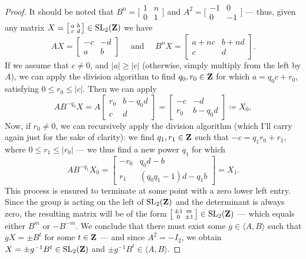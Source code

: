 \begin{proof}
It should be noted that \(B^n = \big[ \begin{smallmatrix} 1 & n \\ 0 &
1 \end{smallmatrix} \big]\) and \(A^2 = \big[ \begin{smallmatrix} -1 & 0 \\ 0 &
-1 \end{smallmatrix} \big]\) --- thus, given any matrix \(X =
\big[ \begin{smallmatrix} a & b \\ c & d \end{smallmatrix} \big] \in \operatorname{SL}_2(\mathbf{Z})\)
we have
\[
  A X =
  \begin{bmatrix}
    -c & -d \\ a & b
  \end{bmatrix}
  \quad
  \text{ and }
  \quad
  B^n X =
  \begin{bmatrix}
    a + n c & b + n d \\ c & d
  \end{bmatrix}.
\]
If we assume that \(c \neq 0\), and \(|a| \geq |c|\) (otherwise, simply multiply
from the left by \(A\)), we can apply the division algorithm to find \(q_0, r_0
\in \mathbf{Z}\) for which \(a = q_0 c + r_0\), satisfying \(0 \leq r_0 \leq
|c|\). Then we can apply
\[
A B^{-q_0}X = A
\begin{bmatrix}
  r_0 & b - q_0 d \\ c & d
\end{bmatrix}
=
\begin{bmatrix}
  - c & - d \\ r_0  & b - q_0 d
\end{bmatrix} \coloneq X_0,
\]
Now, if \(r_0 \neq 0\), we can recursively apply the division algorithm (which
I'll carry again just for the sake of clarity): we find \(q_1, r_1 \in \mathbf{Z}\) such
that \(-c = q_1 r_0 + r_1\), where \(0 \leq r_1 \leq |r_0|\) --- we thus find a
new power \(q_1\) for which
\[
A B^{-q_1} X_0 =
\begin{bmatrix}
  -r_0 & q_0 d - b \\
  r_1  & (q_0 q_1 - 1) d - q_1 b
\end{bmatrix}
= X_1.
\]
This process is ensured to terminate at some point with a zero lower left
entry. Since the group is acting on the left of \(\operatorname{SL}_2(\mathbf{Z})\) and the
determinant is always zero, the resulting matrix will be of the form
\(\big[
\begin{smallmatrix}
  \pm 1 & m \\ 0 & \pm 1
\end{smallmatrix}\big] \in \operatorname{SL}_2(\mathbf{Z})\) --- which equals either \(B^m\) or
\(-B^{-m}\). We conclude that there must exist some \(g \in \langle A, B
\rangle\) such that \(g X = \pm B^t\) for some \(t \in \mathbf{Z}\) --- and since \(A^2
= - I_2\), we obtain \(X = \pm g^{-1} B^t \in \operatorname{SL}_2(\mathbf{Z})\) and \(\pm g^{-1} B^t
\in \langle A, B \rangle\).
\end{proof}

